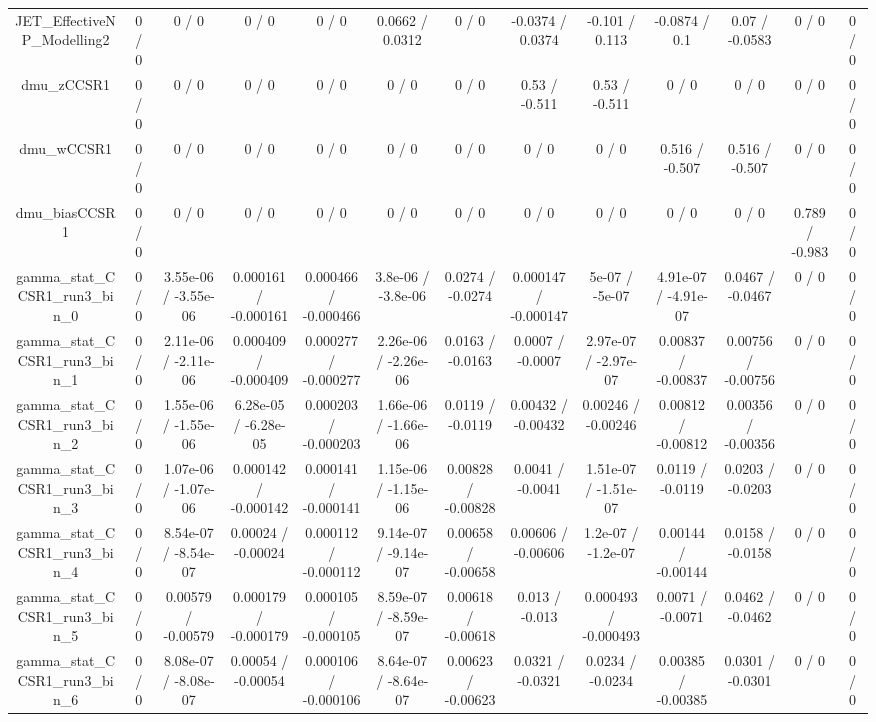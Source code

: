 \documentclass[10pt]{article}
\begin{document}
\begin{table}[htbp]
\begin{center}
\begin{tabular}{|c|c|c|c|c|c|c|c|c|c|c|c|c|}
  JET_EffectiveNP_Modelling2 & 0 / 0 & 0 / 0 & 0 / 0 & 0 / 0 & 0.0662 / 0.0312 & 0 / 0 & -0.0374 / 0.0374 & -0.101 / 0.113 & -0.0874 / 0.1 & 0.07 / -0.0583 & 0 / 0 & 0 / 0 \\ 
  dmu_zCCSR1 & 0 / 0 & 0 / 0 & 0 / 0 & 0 / 0 & 0 / 0 & 0 / 0 & 0.53 / -0.511 & 0.53 / -0.511 & 0 / 0 & 0 / 0 & 0 / 0 & 0 / 0 \\ 
  dmu_wCCSR1 & 0 / 0 & 0 / 0 & 0 / 0 & 0 / 0 & 0 / 0 & 0 / 0 & 0 / 0 & 0 / 0 & 0.516 / -0.507 & 0.516 / -0.507 & 0 / 0 & 0 / 0 \\ 
  dmu_biasCCSR1 & 0 / 0 & 0 / 0 & 0 / 0 & 0 / 0 & 0 / 0 & 0 / 0 & 0 / 0 & 0 / 0 & 0 / 0 & 0 / 0 & 0.789 / -0.983 & 0 / 0 \\ 
  gamma_stat_CCSR1_run3_bin_0 & 0 / 0 & 3.55e-06 / -3.55e-06 & 0.000161 / -0.000161 & 0.000466 / -0.000466 & 3.8e-06 / -3.8e-06 & 0.0274 / -0.0274 & 0.000147 / -0.000147 & 5e-07 / -5e-07 & 4.91e-07 / -4.91e-07 & 0.0467 / -0.0467 & 0 / 0 & 0 / 0 \\ 
  gamma_stat_CCSR1_run3_bin_1 & 0 / 0 & 2.11e-06 / -2.11e-06 & 0.000409 / -0.000409 & 0.000277 / -0.000277 & 2.26e-06 / -2.26e-06 & 0.0163 / -0.0163 & 0.0007 / -0.0007 & 2.97e-07 / -2.97e-07 & 0.00837 / -0.00837 & 0.00756 / -0.00756 & 0 / 0 & 0 / 0 \\ 
  gamma_stat_CCSR1_run3_bin_2 & 0 / 0 & 1.55e-06 / -1.55e-06 & 6.28e-05 / -6.28e-05 & 0.000203 / -0.000203 & 1.66e-06 / -1.66e-06 & 0.0119 / -0.0119 & 0.00432 / -0.00432 & 0.00246 / -0.00246 & 0.00812 / -0.00812 & 0.00356 / -0.00356 & 0 / 0 & 0 / 0 \\ 
  gamma_stat_CCSR1_run3_bin_3 & 0 / 0 & 1.07e-06 / -1.07e-06 & 0.000142 / -0.000142 & 0.000141 / -0.000141 & 1.15e-06 / -1.15e-06 & 0.00828 / -0.00828 & 0.0041 / -0.0041 & 1.51e-07 / -1.51e-07 & 0.0119 / -0.0119 & 0.0203 / -0.0203 & 0 / 0 & 0 / 0 \\ 
  gamma_stat_CCSR1_run3_bin_4 & 0 / 0 & 8.54e-07 / -8.54e-07 & 0.00024 / -0.00024 & 0.000112 / -0.000112 & 9.14e-07 / -9.14e-07 & 0.00658 / -0.00658 & 0.00606 / -0.00606 & 1.2e-07 / -1.2e-07 & 0.00144 / -0.00144 & 0.0158 / -0.0158 & 0 / 0 & 0 / 0 \\ 
  gamma_stat_CCSR1_run3_bin_5 & 0 / 0 & 0.00579 / -0.00579 & 0.000179 / -0.000179 & 0.000105 / -0.000105 & 8.59e-07 / -8.59e-07 & 0.00618 / -0.00618 & 0.013 / -0.013 & 0.000493 / -0.000493 & 0.0071 / -0.0071 & 0.0462 / -0.0462 & 0 / 0 & 0 / 0 \\ 
  gamma_stat_CCSR1_run3_bin_6 & 0 / 0 & 8.08e-07 / -8.08e-07 & 0.00054 / -0.00054 & 0.000106 / -0.000106 & 8.64e-07 / -8.64e-07 & 0.00623 / -0.00623 & 0.0321 / -0.0321 & 0.0234 / -0.0234 & 0.00385 / -0.00385 & 0.0301 / -0.0301 & 0 / 0 & 0 / 0 \\ 

\end{tabular}
\end{center}
\end{table}
\end{document}
